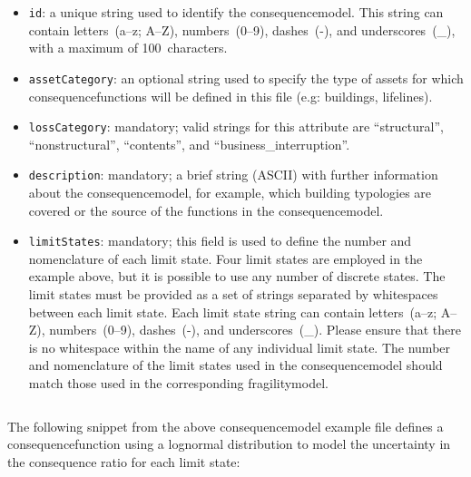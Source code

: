 \begin{itemize}

  \item \Verb+id+: a unique string used to identify the \gls{consequencemodel}.
    This string can contain letters~(a--z; A--Z), numbers~(0--9), dashes~(-), 
    and underscores~(\_), with a maximum of 100~characters.

  \item \Verb+assetCategory+: an optional string used to specify the type of
    \glspl{asset} for which \glspl{consequencefunction} will be defined in
    this file (e.g: buildings, lifelines).

  \item \Verb+lossCategory+: mandatory; valid strings for this attribute are 
    ``structural'', ``nonstructural'', ``contents'', and 
    ``business\_interruption''.

  \item \Verb+description+: mandatory; a brief string (ASCII) with further 
    information about the \gls{consequencemodel}, for example, which building
    typologies are covered or the source of the functions in the
    \gls{consequencemodel}.

  \item \Verb+limitStates+: mandatory; this field is used to define the number and 
    nomenclature of each limit state. Four limit states are employed in the 
    example above, but it is possible to use any number of discrete states. The 
    limit states must be provided as a set of strings separated by whitespaces 
    between each limit state. Each limit state string can contain
    letters~(a--z; A--Z), numbers~(0--9), dashes~(-), and underscores~(\_). 
    Please ensure that there is no whitespace within the name of any individual
    limit state. The number and nomenclature of the limit states used in the
    \gls{consequencemodel} should match those used in the corresponding
    \gls{fragilitymodel}.

\end{itemize}

\inputminted[firstline=4,firstnumber=4,lastline=9,fontsize=\footnotesize,frame=single,linenos,bgcolor=lightgray]{xml}{oqum/risk/verbatim/input_consequence.xml}

The following snippet from the above \gls{consequencemodel} example file
defines a \gls{consequencefunction} using a lognormal distribution to model
the uncertainty in the consequence ratio for each limit state:

